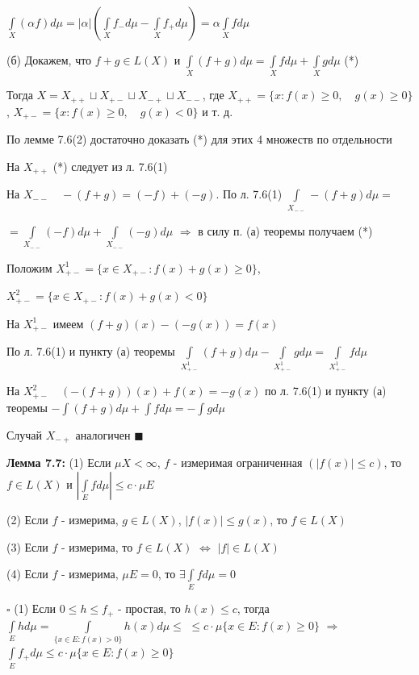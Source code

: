 \documentclass[a4paper]{report}
\begin{document}
$\displaystyle\int\limits_X(\alpha f)d\mu=|\alpha|(\displaystyle\int\limits_X f_-d\mu-\displaystyle\int\limits_X f_+d\mu)=\alpha\displaystyle\int\limits_X fd\mu$

(б) Докажем, что $f+g\in L(X)$ и $\displaystyle\int\limits_X(f+g)d\mu=\displaystyle\int\limits_X fd\mu+\displaystyle\int\limits_X gd\mu$  (*)

Тогда $X=X_{++}\sqcup X_{+-}\sqcup X_{-+}\sqcup X_{--}$, где $X_{++}=\{x\colon f(x)\ge0,\quad g(x)\ge0\}$, $X_{+-}=\{x\colon f(x)\ge0,\quad g(x)<0\}$ и т. д.

По лемме 7.6(2) достаточно доказать (*) для этих 4 множеств по отдельности

На $X_{++}$ (*) следует из л. 7.6(1)

На $X_{--}\quad-(f+g)=(-f)+(-g)$. По л. 7.6(1) $\displaystyle\int\limits_{X_{--}}-(f+g)d\mu=$

\noindent $=\displaystyle\int\limits_{X_{--}}(-f)d\mu+\displaystyle\int\limits_{X_{--}}(-g)d\mu$ $\Rightarrow$ в силу п. (а) теоремы получаем (*)

Положим $X_{+-}^1=\{x\in X_{+-}\colon f(x)+g(x)\ge0\}$, 

$X_{+-}^2=\{x\in X_{+-}\colon f(x)+g(x)<0\}$

На $X_{+-}^1$ имеем $(f+g)(x)-(-g(x))=f(x)$

По л. 7.6(1) и пункту (а) теоремы $\displaystyle\int\limits_{X_{+-}^1}(f+g)d\mu-\displaystyle\int\limits_{X_{+-}^1}gd\mu=\displaystyle\int\limits_{X_{+-}^1}fd\mu$

На $X_{+-}^2\quad(-(f+g))(x)+f(x)=-g(x)$ по л. 7.6(1) и пункту (а) теоремы $-\displaystyle\int(f+g)d\mu+\displaystyle\int fd\mu=-\displaystyle\int gd\mu$

Случай $X_{-+}$ аналогичен $\blacksquare$
\bigskip

\noindent\textbf{Лемма 7.7:} (1) Если $\mu X<\infty$, $f$ - измеримая ограниченная $(|f(x)|\le c)$, то $f\in L(X)$ и $\left|\displaystyle\int\limits_E fd\mu\right|\le c\cdot\mu E$

(2) Если $f$ - измерима, $g\in L(X)$, $|f(x)|\le g(x)$, то $f\in L(X)$

(3) Если $f$ - измерима, то $f\in L(X)$ $\Leftrightarrow$ $|f|\in L(X)$

(4) Если $f$ - измерима, $\mu E=0$, то $\exists\displaystyle\int\limits_E fd\mu=0$

\noindent $\square$ (1) Если $0\le h\le f_+$ - простая, то $h(x)\le c$, тогда $\displaystyle\int\limits_E hd\mu=\displaystyle\int\limits_{\{x\in E\colon f(x)>0\}} h(x) d\mu\le$
\noindent $\le c\cdot\mu\{x\in E\colon f(x)\ge0\}$ $\Rightarrow$ $\displaystyle\int\limits_E f_+d\mu\le c\cdot\mu\{x\in E\colon f(x)\ge0\}$
\end{document}
